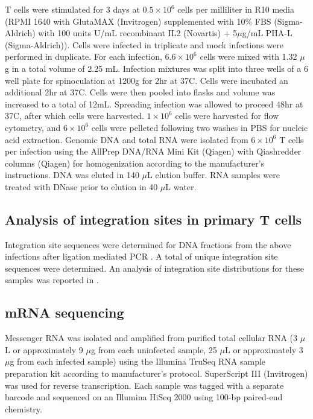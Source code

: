 \documentclass[../sherrill-Mix_thesis.tex]{subfiles}
\begin{document}
		T cells were stimulated for 3 days at $0.5 \times 10^6$ cells per milliliter in R10 media (RPMI 1640 with GlutaMAX (Invitrogen) supplemented with 10\% FBS (Sigma-Aldrich) with 100 units U/mL recombinant IL2 (Novartis) + 5$\mu$g/mL PHA-L (Sigma-Aldrich)).  Cells were infected in triplicate and mock infections were performed in duplicate.  For each infection, $6.6 \times 10^6$ cells were mixed with 1.32 $\mu$g \hivEight{} in a total volume of 2.25 mL.  Infection mixtures was split into three wells of a 6 well plate for spinoculation at 1200g for 2hr at 37\degree{}C.  Cells were incubated an additional 2hr at 37\degree{}C.  Cells were then pooled into flasks and volume was increased to a total of 12mL.  Spreading infection was allowed to proceed 48hr at 37\degree{}C, after which cells were harvested.  $1 \times 10^6$ cells were harvested for flow cytometry, and $6 \times 10^6$ cells were pelleted following two washes in PBS for nucleic acid extraction.  Genomic DNA and total RNA were isolated from $6 \times 10^6$ T cells per infection using the AllPrep DNA/RNA Mini Kit (Qiagen) with Qiashredder columns (Qiagen) for homogenization according to the manufacturer's instructions.  DNA was eluted in 140 $\mu$L elution buffer.   RNA samples were treated with DNase prior to elution in 40 $\mu$L water.
		
	\subsection{Analysis of \hivEight{} integration sites in primary T cells}
		Integration site sequences were determined for DNA fractions from the above infections after ligation mediated PCR \citep{Berry2014}. A total of \nIntegrations{} unique integration site sequences were determined. An analysis of integration site distributions for these samples was reported in \citet{Berry2014}. 

	\subsection{mRNA sequencing}
		Messenger RNA was isolated and amplified from purified total cellular RNA (3 $\mu$L or approximately 9 $\mu$g from each uninfected sample, 25 $\mu$L or approximately 3 $\mu$g from each infected sample) using the Illumina TruSeq RNA sample preparation kit according to manufacturer's protocol.  SuperScript III (Invitrogen) was used for reverse transcription. Each sample was tagged with a separate barcode and sequenced on an Illumina HiSeq 2000 using 100-bp paired-end chemistry. 
\end{document}
